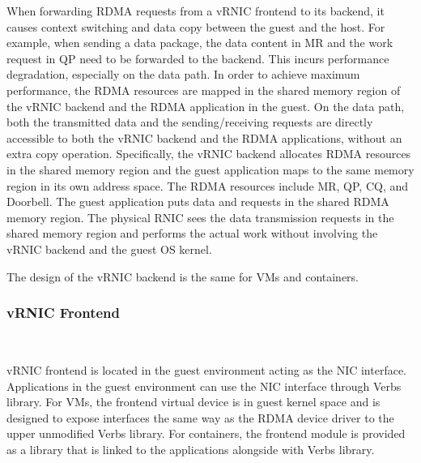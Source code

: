 
When forwarding RDMA requests from a vRNIC frontend to its backend, it causes context switching and data copy between the guest and the host. For example, when sending a data package, the data content in MR and the work request in QP need to be forwarded to the backend. This incurs performance degradation, especially on the data path. In order to achieve maximum performance, the RDMA resources are mapped in the shared memory region of the vRNIC backend and the RDMA application in the guest. On the data path, both the transmitted data and the sending/receiving requests are directly accessible to both the vRNIC backend and the RDMA applications, without an extra copy operation. Specifically, the vRNIC backend allocates RDMA resources in the shared memory region and the guest application maps to the same memory region in its own address space. The RDMA resources include MR, QP, CQ, and Doorbell. The guest application puts data and requests in the shared RDMA memory region. The physical RNIC sees the data transmission requests in the shared memory region and performs the actual work without involving the vRNIC backend and the guest OS kernel.

The design of the vRNIC backend is the same for VMs and containers.

\subsubsection{\textbf{vRNIC Frontend}}

\
\noindent

vRNIC frontend is located in the guest environment acting as the NIC interface. Applications in the guest environment can use the NIC interface through Verbs library. For VMs, the frontend virtual device is in guest kernel space and is designed to expose interfaces the same way as the RDMA device driver to the upper unmodified Verbs library. For containers, the frontend module is provided as a library that is linked to the applications alongside with Verbs library.

